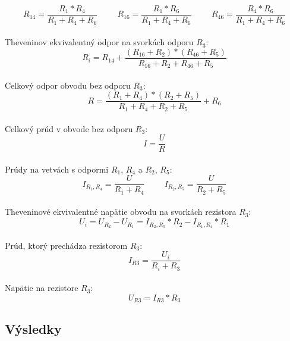 \documentclass[10pt,a4paper]{article}
\begin{document}
\begin{equation*}
R_{14} = \frac{R_1*R_4}{R_1+R_4+R_6} \hspace{1cm} R_{16} = \frac{R_1*R_6}{R_1+R_4+R_6} \hspace{1cm} R_{46} = \frac{R_4*R_6}{R_1+R_4+R_6}
\end{equation*}
\\
Theveninov ekvivalentný odpor na svorkách odporu $R_3$:
\\
\begin{equation*}
R_i = R_{14} + \frac{(R_{16}+R_2)*(R_{46}+R_5)}{R_{16}+R_2+R_{46}+R_5}
\end{equation*}
\\
Celkový odpor obvodu bez odporu $R_3$:
\\
\begin{equation*}
R = \frac{(R_1+R_4)*(R_2+R_5)}{R_1+R_4+R_2+R_5} + R_6
\end{equation*}
\\
Celkový prúd v obvode bez odporu $R_3$:
\\
\begin{equation*}
I = \frac{U}{R}
\end{equation*}
\\
Prúdy na vetvách s odpormi $R_1$, $R_4$ a $R_2$, $R_5$:
\\
\begin{equation*}
I_{R_1,R_4} = \frac{U}{R_1+R_4} \hspace{1cm} I_{R_2,R_5} = \frac{U}{R_2+R_5}
\end{equation*}
\\
Theveninové ekvivalentné napätie obvodu na svorkách rezistora $R_3$:
\\
\begin{equation*}
U_i = U_{R_2} - U_{R_1} = I_{R_2,R_5}*R_2 - I_{R_1,R_4}*R_1
\end{equation*}
\\
Prúd, ktorý prechádza rezistorom $R_3$:
\\
\begin{equation*}
I_{R3} = \frac{U_i}{R_i+R_3}
\end{equation*}
\\
Napätie na rezistore $R_3$:
\\
\begin{equation*}
U_{R3} = I_{R3}*R_3
\end{equation*}

\subsection{Výsledky}
\end{document}
